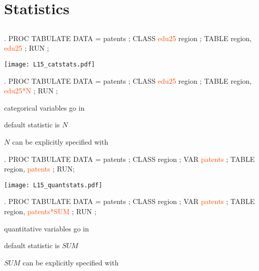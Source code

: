 \section[Statistics]{Statistics}
\subsection{}
\begin{frame}
\end{frame}


\begin{frame}[fragile]
\hspace*{-0.3in}
\begin{code}{.}
PROC TABULATE DATA = patents ;
   CLASS \textcolor{OrangeRed}{edu25} region ;
   TABLE region, \textcolor{OrangeRed}{edu25} ;
RUN ;
\end{code}
\texttt{[image: L15\_catstats.pdf]}
\emp
\blankcolumn
{}
\begin{code}{.}
PROC TABULATE DATA = patents ;
   CLASS \textcolor{OrangeRed}{edu25} region ;
   TABLE region, \textcolor{OrangeRed}{edu25*N} ;
RUN ;
\end{code}
\bi
\item categorical variables go in 
\item default statistic is $N$
\item $N$ can be explicitly specified with \ttt{*}
\item[]
\item[]
\ei
\emp
\end{frame}


\begin{frame}[fragile]
\hspace*{-0.3in}
\begin{code}{.}
PROC TABULATE DATA = patents ;
   CLASS region ;
   VAR \textcolor{OrangeRed}{patents} ;
   TABLE region, \textcolor{OrangeRed}{patents} ;
RUN;
\end{code}
\texttt{[image: L15\_quantstats.pdf]}
\emp
\blankcolumn
{}
\begin{code}{.}
PROC TABULATE DATA = patents ;
   CLASS region ;
   VAR \textcolor{OrangeRed}{patents} ;
   TABLE region, \textcolor{OrangeRed}{patents*SUM} ;
RUN ;
\end{code}
\bi
\item quantitative variables go in 
\item default statistic is $SUM$
\item $SUM$ can be explicitly specified with \ttt{*}
\item[]
\item[]
\ei
\emp
\end{frame}




